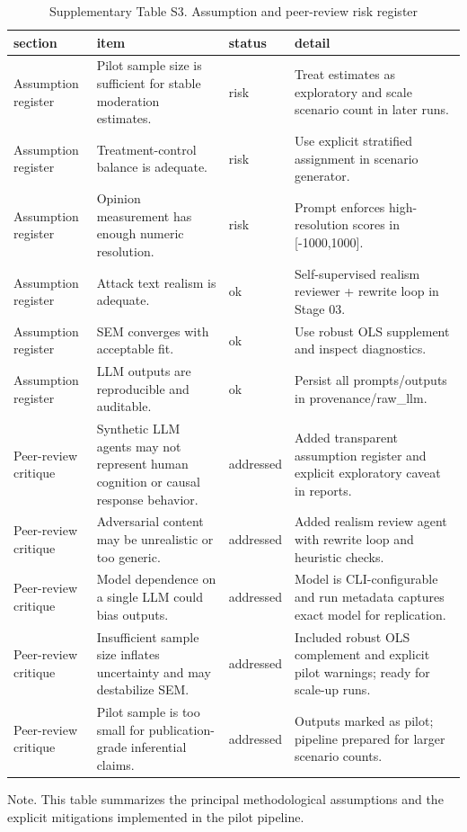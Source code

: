 \begin{table}[htbp]
\centering
\begin{threeparttable}
\caption{Supplementary Table S3. Assumption and peer-review risk register}
\label{tab:supp_risks}
\small
\begin{tabular}{llll}
\toprule
section & item & status & detail \\
\midrule
Assumption register & Pilot sample size is sufficient for stable moderation estimates. & risk & Treat estimates as exploratory and scale scenario count in later runs. \\
Assumption register & Treatment-control balance is adequate. & risk & Use explicit stratified assignment in scenario generator. \\
Assumption register & Opinion measurement has enough numeric resolution. & risk & Prompt enforces high-resolution scores in [-1000,1000]. \\
Assumption register & Attack text realism is adequate. & ok & Self-supervised realism reviewer + rewrite loop in Stage 03. \\
Assumption register & SEM converges with acceptable fit. & ok & Use robust OLS supplement and inspect diagnostics. \\
Assumption register & LLM outputs are reproducible and auditable. & ok & Persist all prompts/outputs in provenance/raw\_llm. \\
Peer-review critique & Synthetic LLM agents may not represent human cognition or causal response behavior. & addressed & Added transparent assumption register and explicit exploratory caveat in reports. \\
Peer-review critique & Adversarial content may be unrealistic or too generic. & addressed & Added realism review agent with rewrite loop and heuristic checks. \\
Peer-review critique & Model dependence on a single LLM could bias outputs. & addressed & Model is CLI-configurable and run metadata captures exact model for replication. \\
Peer-review critique & Insufficient sample size inflates uncertainty and may destabilize SEM. & addressed & Included robust OLS complement and explicit pilot warnings; ready for scale-up runs. \\
Peer-review critique & Pilot sample is too small for publication-grade inferential claims. & addressed & Outputs marked as pilot; pipeline prepared for larger scenario counts. \\
\bottomrule
\end{tabular}

\begin{tablenotes}[flushleft]\footnotesize\item Note. This table summarizes the principal methodological assumptions and the explicit mitigations implemented in the pilot pipeline.\end{tablenotes}
\end{threeparttable}
\end{table}